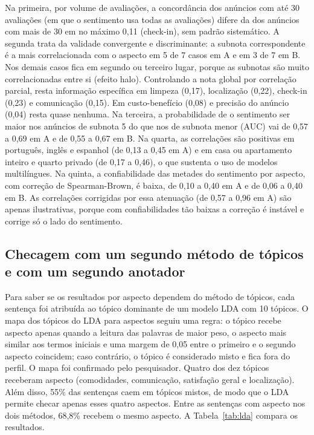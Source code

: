 Na primeira, por volume de avaliações, a concordância dos anúncios com até 30 avaliações (em que o sentimento usa todas as avaliações) difere da dos anúncios com mais de 30 em no máximo 0,11 (check-in), sem padrão sistemático. A segunda trata da validade convergente e discriminante: a subnota correspondente é a mais correlacionada com o aspecto em 5 de 7 casos em A e em 3 de 7 em B. Nos demais casos fica em segundo ou terceiro lugar, porque as subnotas são muito correlacionadas entre si (efeito halo). Controlando a nota global por correlação parcial, resta informação específica em limpeza (0,17), localização (0,22), check-in (0,23) e comunicação (0,15). Em custo-benefício (0,08) e precisão do anúncio (0,04) resta quase nenhuma. Na terceira, a probabilidade de o sentimento ser maior nos anúncios de subnota 5 do que nos de subnota menor (AUC) vai de 0,57 a 0,69 em A e de 0,55 a 0,67 em B. Na quarta, as correlações são positivas em português, inglês e espanhol (de 0,13 a 0,45 em A) e em casa ou apartamento inteiro e quarto privado (de 0,17 a 0,46), o que sustenta o uso de modelos multilíngues. Na quinta, a confiabilidade das metades do sentimento por aspecto, com correção de Spearman-Brown, é baixa, de 0,10 a 0,40 em A e de 0,06 a 0,40 em B. As correlações corrigidas por essa atenuação (de 0,57 a 0,96 em A) são apenas ilustrativas, porque com confiabilidades tão baixas a correção é instável e corrige só o lado do sentimento.

\subsection{Checagem com um segundo método de tópicos e com um segundo anotador}

Para saber se os resultados por aspecto dependem do método de tópicos, cada sentença foi atribuída ao tópico dominante de um modelo LDA com 10 tópicos. O mapa dos tópicos do LDA para aspectos seguiu uma regra: o tópico recebe aspecto apenas quando a leitura das palavras de maior peso, o aspecto mais similar aos termos iniciais e uma margem de 0,05 entre o primeiro e o segundo aspecto coincidem; caso contrário, o tópico é considerado misto e fica fora do perfil. O mapa foi confirmado pelo pesquisador. Quatro dos dez tópicos receberam aspecto (comodidades, comunicação, satisfação geral e localização). Além disso, 55\% das sentenças caem em tópicos mistos, de modo que o LDA permite checar apenas esses quatro aspectos. Entre as sentenças com aspecto nos dois métodos, 68,8\% recebem o mesmo aspecto. A Tabela~\ref{tab:lda} compara os resultados.


